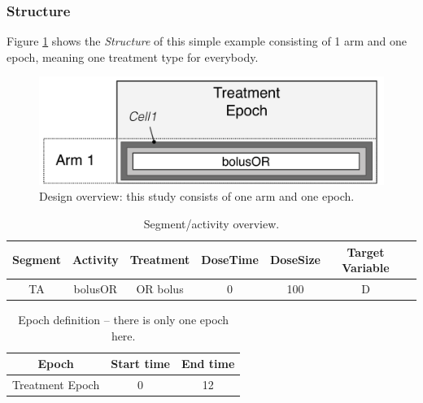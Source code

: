 \subsubsection{Structure}

Figure \ref{fig:designPatternBonate} shows the \textit{Structure} of
this simple example consisting of 1 arm and one epoch, meaning one treatment
type for everybody.

\begin{figure}[ht!]
\centering
\includegraphics[width=0.7\linewidth]{pics/OneArmOneEpoch}
\caption{Design overview: this study consists of one arm and one epoch.}
\label{fig:designPatternBonate}
\end{figure}

\begin{table}[htdp!]
\begin{center}
\renewcommand{\arraystretch}{1.1}%
\begin{tabular}{ccccccc}
\hline
Segment&Activity & Treatment & DoseTime & DoseSize & Target Variable \\
\hline
TA& bolusOR &  OR bolus & 0 & 100 & D \\
\hline
\end{tabular}
\end{center}
\caption{Segment/activity overview.}
\end{table}

\begin{table}[htdp!]
\begin{center}
\renewcommand{\arraystretch}{1.1}%
\begin{tabular}{ccc}
\hline
Epoch & Start time & End time \\
\hline
Treatment Epoch & 0 &  12  \\
\hline
\end{tabular}
\end{center}
\caption{Epoch definition -- there is only one epoch here.}
\label{fig:Bonate:epochDef}
\end{table}

